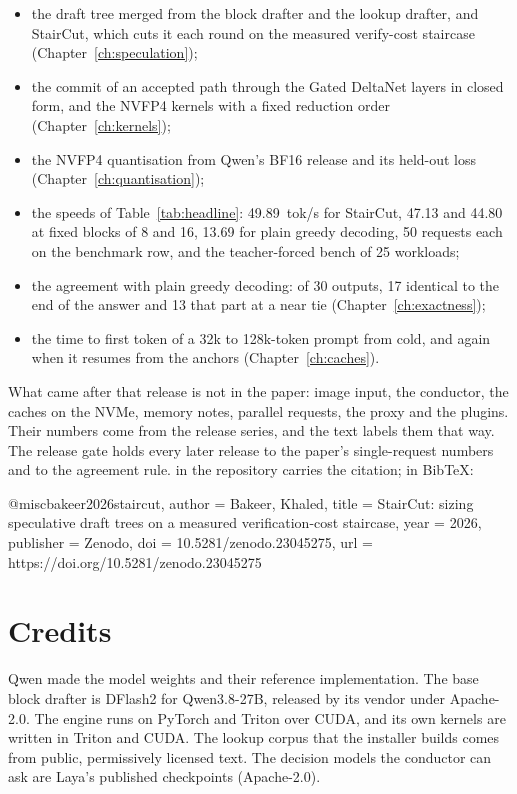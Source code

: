 \begin{itemize}
\item the draft tree merged from the block drafter and the lookup drafter, and StairCut, which cuts it each round on the measured verify-cost staircase (Chapter~\ref{ch:speculation});
\item the commit of an accepted path through the Gated DeltaNet layers in closed form, and the NVFP4 kernels with a fixed reduction order (Chapter~\ref{ch:kernels});
\item the NVFP4 quantisation from Qwen's BF16 release and its held-out loss (Chapter~\ref{ch:quantisation});
\item the speeds of Table~\ref{tab:headline}: 49.89~tok/s for StairCut, 47.13 and 44.80 at fixed blocks of 8 and 16, 13.69 for plain greedy decoding, 50 requests each on the benchmark row, and the teacher-forced bench of 25 workloads;
\item the agreement with plain greedy decoding: of 30 outputs, 17 identical to the end of the answer and 13 that part at a near tie (Chapter~\ref{ch:exactness});
\item the time to first token of a 32k to 128k-token prompt from cold, and again when it resumes from the anchors (Chapter~\ref{ch:caches}).
\end{itemize}

What came after that release is not in the paper: image input, the conductor, the caches on the NVMe, memory notes, parallel requests, the proxy and the plugins. Their numbers come from the release series, and the text labels them that way. The release gate holds every later release to the paper's single-request numbers and to the agreement rule.  in the repository carries the citation; in BibTeX:

\begin{plain}
@misc{bakeer2026staircut,
  author    = {Bakeer, Khaled},
  title     = {StairCut: sizing speculative draft trees on a measured
               verification-cost staircase},
  year      = {2026},
  publisher = {Zenodo},
  doi       = {10.5281/zenodo.23045275},
  url       = {https://doi.org/10.5281/zenodo.23045275}
}
\end{plain}

\section{Credits}

Qwen made the model weights and their reference implementation. The base block drafter is DFlash2 for Qwen3.8-27B, released by its vendor under Apache-2.0. The engine runs on PyTorch and Triton over CUDA, and its own kernels are written in Triton and CUDA. The lookup corpus that the installer builds comes from public, permissively licensed text. The decision models the conductor can ask are Laya's published checkpoints (Apache-2.0).
